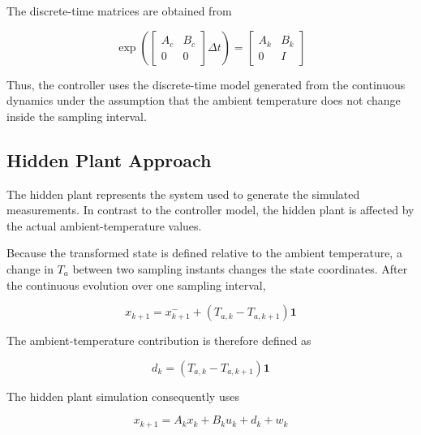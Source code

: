 The discrete-time matrices are obtained from

\begin{equation}
    \exp
    \left(
    \begin{bmatrix}
        A_c & B_c \\
        0 & 0
    \end{bmatrix}
    \Delta t
    \right)
    =
    \begin{bmatrix}
        A_k & B_k \\
        0 & I
    \end{bmatrix}
    \label{eq:district_zoh_matrix}
\end{equation}

Thus, the controller uses the discrete-time model generated from the
continuous dynamics under the assumption that the ambient temperature does
not change inside the sampling interval.


\subsection{Hidden Plant Approach}
\label{subsec:district_hidden_plant}

The hidden plant represents the system used to generate the simulated
measurements. In contrast to the controller model, the hidden plant is
affected by the actual ambient-temperature values.

Because the transformed state is defined relative to the ambient temperature,
a change in \(T_a\) between two sampling instants changes the state
coordinates. After the continuous evolution over one sampling interval,

\begin{equation}
    x_{k+1}
    =
    x_{k+1}^{-}
    +
    \left(
        T_{a,k}-T_{a,k+1}
    \right)\mathbf{1}
    \label{eq:district_ambient_shift}
\end{equation}

The ambient-temperature contribution is therefore defined as

\begin{equation}
    d_k
    =
    \left(
        T_{a,k}-T_{a,k+1}
    \right)\mathbf{1}
    \label{eq:district_dk}
\end{equation}

The hidden plant simulation consequently uses

\begin{equation}
    \boxed{
    x_{k+1}
    =
    A_kx_k
    +
    B_ku_k
    +
    d_k
    +
    w_k
    }
    \label{eq:district_hidden_state}
\end{equation}

